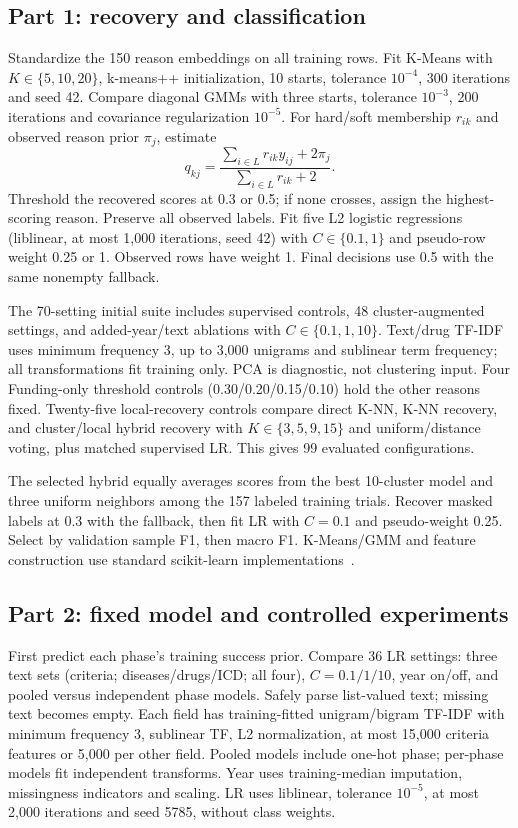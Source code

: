 \documentclass[10pt,twocolumn,letterpaper]{article}
\begin{document}
\subsection{Part 1: recovery and classification}
Standardize the 150 reason embeddings on all training rows. Fit K-Means with
$K\in\{5,10,20\}$, k-means++ initialization, 10 starts, tolerance $10^{-4}$,
300 iterations and seed 42. Compare diagonal GMMs with three starts, tolerance
$10^{-3}$, 200 iterations and covariance regularization $10^{-5}$.
For hard/soft membership $r_{ik}$ and observed reason prior $\pi_j$, estimate
\begin{equation}
q_{kj}=\frac{\sum_{i\in L}r_{ik}y_{ij}+2\pi_j}{\sum_{i\in L}r_{ik}+2}.
\end{equation}
Threshold the recovered scores at 0.3 or 0.5; if none crosses, assign the
highest-scoring reason. Preserve all observed labels. Fit five L2 logistic
regressions (liblinear, at most 1,000 iterations, seed 42) with $C\in\{0.1,1\}$
and pseudo-row weight 0.25 or 1. Observed rows have weight 1. Final decisions
use 0.5 with the same nonempty fallback.

The 70-setting initial suite includes supervised controls, 48 cluster-augmented
settings, and added-year/text ablations with $C\in\{0.1,1,10\}$. Text/drug TF-IDF
uses minimum frequency 3, up to 3,000 unigrams and sublinear term frequency;
all transformations fit training only. PCA is diagnostic, not clustering input.
Four Funding-only threshold controls (0.30/0.20/0.15/0.10) hold the other reasons
fixed. Twenty-five local-recovery controls compare direct K-NN, K-NN recovery,
and cluster/local hybrid recovery with $K\in\{3,5,9,15\}$ and uniform/distance
voting, plus matched supervised LR. This gives 99 evaluated configurations.

The selected hybrid equally averages scores from the best 10-cluster model
and three uniform neighbors among the 157 labeled training trials. Recover
masked labels at 0.3 with the fallback, then fit LR with $C=0.1$ and pseudo-weight
0.25. Select by validation sample F1, then macro F1. K-Means/GMM and feature
construction use standard scikit-learn implementations~\cite{clustering,tfidf}.

\subsection{Part 2: fixed model and controlled experiments}
First predict each phase's training success prior. Compare 36 LR settings:
three text sets (criteria; diseases/drugs/ICD; all four), $C=0.1/1/10$, year
on/off, and pooled versus independent phase models. Safely parse list-valued
text; missing text becomes empty. Each field has training-fitted unigram/bigram
TF-IDF with minimum frequency 3, sublinear TF, L2 normalization, at most 15,000
criteria features or 5,000 per other field. Pooled models include one-hot phase;
per-phase models fit independent transforms. Year uses training-median imputation,
missingness indicators and scaling. LR uses liblinear, tolerance $10^{-5}$,
at most 2,000 iterations and seed 5785, without class weights.
\end{document}
